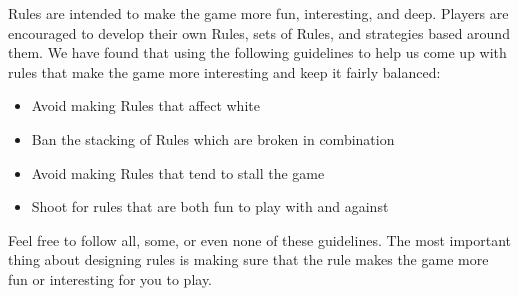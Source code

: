 \documentclass[../rulebook.tex]{subfiles}
\begin{document}
Rules are intended to make the game more fun, interesting, and deep.
Players are encouraged to develop their own Rules, sets of Rules,
and strategies based around them.
We have found that using the following guidelines to help us come up
with rules that make the game more interesting and keep it fairly balanced:
\begin{itemize}
\item Avoid making Rules that affect white
\item Ban the stacking of Rules which are broken in combination
\item Avoid making Rules that tend to stall the game
\item Shoot for rules that are both fun to play with and against
\end{itemize}
Feel free to follow all, some, or even none of these guidelines.
The most important thing about designing rules is making sure
that the rule makes the game more fun or interesting for you to play.
\end{document}
